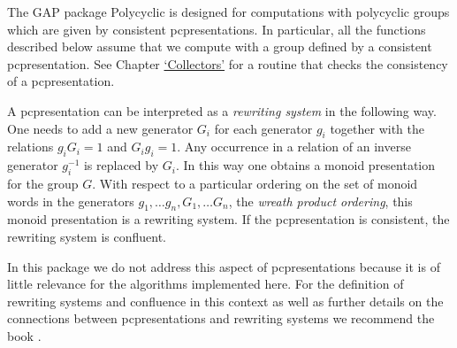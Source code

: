 \documentclass[a4paper,11pt]{report}
\begin{document}
{ The \textsf{GAP} package \textsf{Polycyclic} is designed for computations with polycyclic groups which are given by
consistent pc\texttt{}presentations. In particular, all the
functions described below assume that we compute with a group defined by a
consistent pc\texttt{}presentation. See Chapter \hyperref[Collectors]{`Collectors'} for a routine that checks the consistency of a
pc\texttt{}presentation. 

 A pc\texttt{}presentation can be interpreted as a \emph{rewriting system} in the following way. One needs to add a new generator $G_i$ for each generator $g_i$ together with the relations $g_iG_i = 1$ and $G_ig_i = 1$. Any occurrence in a relation of an inverse generator $g_i^{-1}$ is replaced by $G_i$. In this way one obtains a monoid presentation for the group $G$. With respect to a particular ordering on the set of monoid words in the
generators $g_1,\ldots g_n,G_1,\ldots G_n$, the \emph{wreath product ordering}, this monoid presentation is a rewriting system. If the
pc\texttt{}presentation is consistent, the rewriting system is
confluent. 

 In this package we do not address this aspect of
pc\texttt{}presentations because it is of little relevance for the
algorithms implemented here. For the definition of rewriting systems and
confluence in this context as well as further details on the connections
between pc\texttt{}presentations and rewriting systems we recommend
the book \cite{Sims94}. }

 
\end{document}
